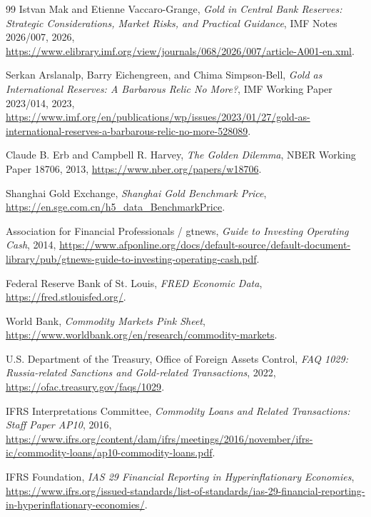 \documentclass[UTF8,fontset=windows,12pt,openany]{ctexbook}
\begin{document}
\begin{thebibliography}{99}
Istvan Mak and Etienne Vaccaro-Grange, \emph{Gold in Central Bank Reserves: Strategic Considerations, Market Risks, and Practical Guidance}, IMF Notes 2026/007, 2026, \url{https://www.elibrary.imf.org/view/journals/068/2026/007/article-A001-en.xml}.

Serkan Arslanalp, Barry Eichengreen, and Chima Simpson-Bell, \emph{Gold as International Reserves: A Barbarous Relic No More?}, IMF Working Paper 2023/014, 2023, \url{https://www.imf.org/en/publications/wp/issues/2023/01/27/gold-as-international-reserves-a-barbarous-relic-no-more-528089}.

Claude B. Erb and Campbell R. Harvey, \emph{The Golden Dilemma}, NBER Working Paper 18706, 2013, \url{https://www.nber.org/papers/w18706}.

Shanghai Gold Exchange, \emph{Shanghai Gold Benchmark Price}, \url{https://en.sge.com.cn/h5_data_BenchmarkPrice}.

Association for Financial Professionals / gtnews, \emph{Guide to Investing Operating Cash}, 2014, \url{https://www.afponline.org/docs/default-source/default-document-library/pub/gtnews-guide-to-investing-operating-cash.pdf}.

Federal Reserve Bank of St. Louis, \emph{FRED Economic Data}, \url{https://fred.stlouisfed.org/}.

World Bank, \emph{Commodity Markets Pink Sheet}, \url{https://www.worldbank.org/en/research/commodity-markets}.

U.S. Department of the Treasury, Office of Foreign Assets Control, \emph{FAQ 1029: Russia-related Sanctions and Gold-related Transactions}, 2022, \url{https://ofac.treasury.gov/faqs/1029}.

IFRS Interpretations Committee, \emph{Commodity Loans and Related Transactions: Staff Paper AP10}, 2016, \url{https://www.ifrs.org/content/dam/ifrs/meetings/2016/november/ifrs-ic/commodity-loans/ap10-commodity-loans.pdf}.

IFRS Foundation, \emph{IAS 29 Financial Reporting in Hyperinflationary Economies}, \url{https://www.ifrs.org/issued-standards/list-of-standards/ias-29-financial-reporting-in-hyperinflationary-economies/}.

\end{thebibliography}
\end{document}
